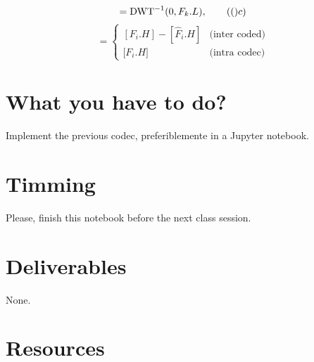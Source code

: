 \begin{equation}
  [F_k.L] = \text{DWT}^{-1}(0, F_k.L),
  \tag(c)
\end{equation}
\begin{equation}
  [E_i.H] = \left\{
  \begin{array}{ll}
    [F_i.H] - [\hat{F}_i.H] & \text{(inter coded)} \\
    {[}F_i.H{]}                 & \text{(intra codec)}
  \end{array}
  \right.
\end{equation}

\section{What you have to do?}

Implement the previous codec, preferiblemente in a Jupyter notebook. 

\section{Timming}

Please, finish this notebook before the next class session.

\section{Deliverables}

None.

\section{Resources}


